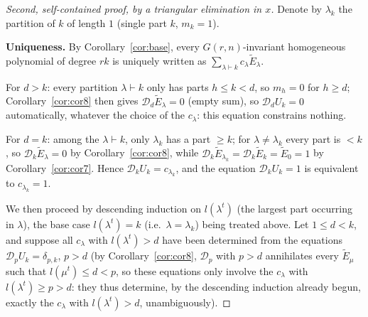\documentclass[10pt,a4paper]{amsart}
\begin{document}
\begin{proof}[Second, self-contained proof, by a triangular elimination in $x$]
Denote by $\lambda_k$ the partition of $k$ of length $1$ (single part $k$, $m_k=1$).

\smallskip
\noindent\textbf{Uniqueness.} By Corollary~\ref{cor:base}, every $G(r,n)$-invariant homogeneous polynomial of degree $rk$ is uniquely written as $\sum_{\lambda\vdash k}c_\lambda\widetilde E_\lambda$.

For $d>k$: every partition $\lambda\vdash k$ only has parts $h\le k<d$, so $m_h=0$ for $h\ge d$; Corollary~\ref{cor:cor8} then gives $\mathcal D_d\widetilde E_\lambda=0$ (empty sum), so $\mathcal D_dU_k=0$ automatically, whatever the choice of the $c_\lambda$: this equation constrains nothing.

For $d=k$: among the $\lambda\vdash k$, only $\lambda_k$ has a part $\ge k$; for $\lambda\ne\lambda_k$ every part is $<k$, so $\mathcal D_k\widetilde E_\lambda=0$ by Corollary~\ref{cor:cor8}, while $\mathcal D_k\widetilde E_{\lambda_k}=\mathcal D_k\widetilde E_k=\widetilde E_0=1$ by Corollary~\ref{cor:cor7}. Hence $\mathcal D_kU_k=c_{\lambda_k}$, and the equation $\mathcal D_kU_k=1$ is equivalent to $c_{\lambda_k}=1$.

We then proceed by descending induction on $l(\lambda^t)$ (the largest part occurring in $\lambda$), the base case $l(\lambda^t)=k$ (i.e.\ $\lambda=\lambda_k$) being treated above. Let $1\le d<k$, and suppose all $c_\lambda$ with $l(\lambda^t)>d$ have been determined from the equations $\mathcal D_pU_k=\delta_{p,k}$, $p>d$ (by Corollary~\ref{cor:cor8}, $\mathcal D_p$ with $p>d$ annihilates every $\widetilde E_\mu$ such that $l(\mu^t)\le d<p$, so these equations only involve the $c_\lambda$ with $l(\lambda^t)\ge p>d$: they thus determine, by the descending induction already begun, exactly the $c_\lambda$ with $l(\lambda^t)>d$, unambiguously).


\end{proof}
\end{document}
